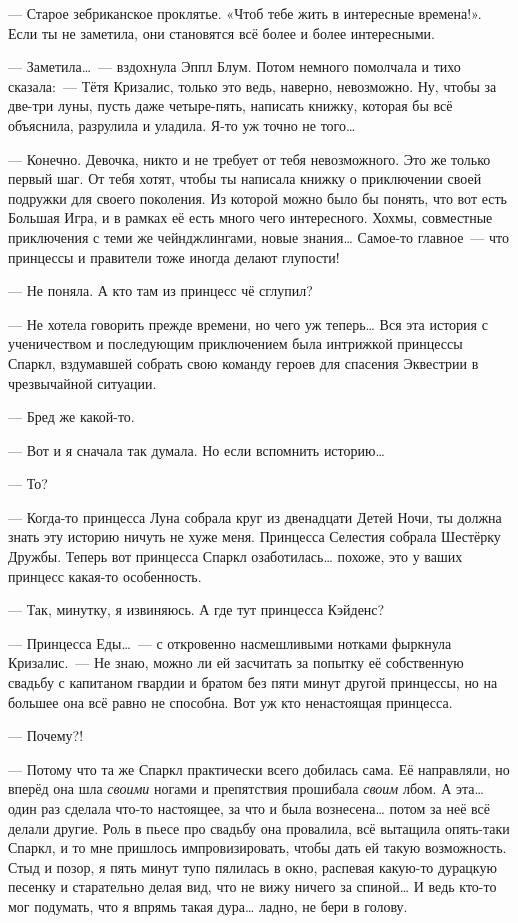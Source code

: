 \documentclass[fontsize=11pt,a5paper,titlepage=firstcover]{scrbook}
\begin{document}
--- Старое зебриканское проклятье. «Чтоб тебе жить в интересные времена!». Если ты не заметила, они становятся всё более и более интересными.

--- Заметила{\ldots}~--- вздохнула Эппл Блум. Потом немного помолчала и тихо сказала:~--- Тётя Кризалис, только это ведь, наверно, невозможно. Ну, чтобы за две-три луны, пусть даже четыре-пять, написать книжку, которая бы всё объяснила, разрулила и уладила. Я-то уж точно не того{\ldots}

--- Конечно. Девочка, никто и не требует от тебя невозможного. Это же только первый шаг. От тебя хотят, чтобы ты написала книжку о приключении своей подружки для своего поколения. Из которой можно было бы понять, что вот есть Большая Игра, и в рамках её есть много чего интересного. Хохмы, совместные приключения с теми же чейнджлингами, новые знания{\ldots} Самое-то главное~--- что принцессы и правители тоже иногда делают глупости!

--- Не поняла. А кто там из принцесс чё сглупил?

--- Не хотела говорить прежде времени, но чего уж теперь{\ldots} Вся эта история с ученичеством и последующим приключением была интрижкой принцессы Спаркл, вздумавшей собрать свою команду героев для спасения Эквестрии в чрезвычайной ситуации.

--- Бред же какой-то.

--- Вот и я сначала так думала. Но если вспомнить историю{\ldots}

--- То?

--- Когда-то принцесса Луна собрала круг из двенадцати Детей Ночи, ты должна знать эту историю ничуть не хуже меня. Принцесса Селестия собрала Шестёрку Дружбы. Теперь вот принцесса Спаркл озаботилась{\ldots} похоже, это у ваших принцесс какая-то особенность.

--- Так, минутку, я извиняюсь. А где тут принцесса Кэйденс?

--- Принцесса Еды{\ldots}~--- с откровенно насмешливыми нотками фыркнула Кризалис.~--- Не знаю, можно ли ей засчитать за попытку её собственную свадьбу с капитаном гвардии и братом без пяти минут другой принцессы, но на большее она всё равно не способна. Вот уж кто ненастоящая принцесса.

--- Почему?!

--- Потому что та же Спаркл практически всего добилась сама. Её направляли, но вперёд она шла \emph{своими} ногами и препятствия прошибала \emph{своим} лбом. А эта{\ldots} один раз сделала что-то настоящее, за что и была вознесена{\ldots} потом за неё всё делали другие. Роль в пьесе про свадьбу она провалила, всё вытащила опять-таки Спаркл, и то мне пришлось импровизировать, чтобы дать ей такую возможность. Стыд и позор, я пять минут тупо пялилась в окно, распевая какую-то дурацкую песенку и старательно делая вид, что не вижу ничего за спиной{\ldots} И ведь кто-то мог подумать, что я впрямь такая дура{\ldots} ладно, не бери в голову.
\end{document}
